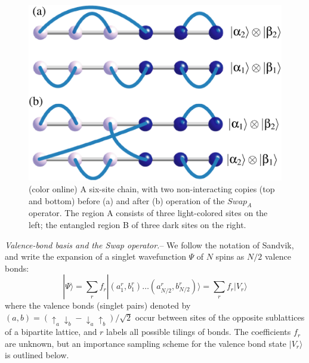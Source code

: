 \documentclass[prl,aps,twocolumn,floatfix,amsmath,amssymb,superscriptaddress,tightenlines]{revtex4}
\begin{document}
\begin{figure} {
\includegraphics[width=2.5
in]{swap_2.eps} \caption{(color online) 
\label{swap_2}
A six-site chain, with two non-interacting copies (top and bottom) before (a) and after (b) operation of the $Swap_A$ operator.  
The region A consists of three light-colored sites on the left; the entangled region B of three dark sites on the right.
}
} \end{figure}

{\it Valence-bond basis and the Swap operator.}-- We follow the notation of Sandvik, and write the expansion of a singlet
wavefunction $\Psi$ of $N$ spins as $N/2$ valence bonds:
\begin{equation}
| \Psi \rangle = \sum_r f_r|(a^r_1,b^r_1) \ldots (a^r_{N/2},b^r_{N/2}) \rangle = \sum_r f_r| V_r \rangle
\end{equation}
where the valence bonds (singlet pairs) denoted by $(a,b) = (\uparrow_a \downarrow_b - \downarrow_a \uparrow_b)/\sqrt{2}$ occur between sites of the opposite sublattices of a bipartite lattice, and $r$ labels all possible tilings of bonds.  The coefficients $f_r$ are unknown, but an importance sampling scheme for the valence bond state $| V_r \rangle$ is outlined below.  
\end{document}
